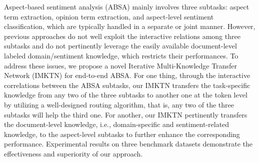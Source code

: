 Aspect-based sentiment analysis (ABSA) mainly involves three subtasks: aspect term extraction, opinion term extraction, and aspect-level sentiment classification, which are typically handled in a separate or joint manner. However, previous approaches do not well exploit the interactive relations among three subtasks and do not pertinently leverage the easily available document-level labeled domain/sentiment knowledge, which restricts their performances. To address these issues, we propose a novel Iterative Multi-Knowledge Transfer Network (IMKTN) for end-to-end ABSA. For one thing, through the interactive correlations between the ABSA subtasks, our IMKTN transfers the task-specific knowledge from any two of the three subtasks to another one at the token level by utilizing a well-designed routing algorithm, that is, any two of the three subtasks will help the third one. For another, our IMKTN pertinently transfers the document-level knowledge, i.e., domain-specific and sentiment-related knowledge, to the aspect-level subtasks to further enhance the corresponding performance. Experimental results on three benchmark datasets demonstrate the effectiveness and superiority of our approach.
